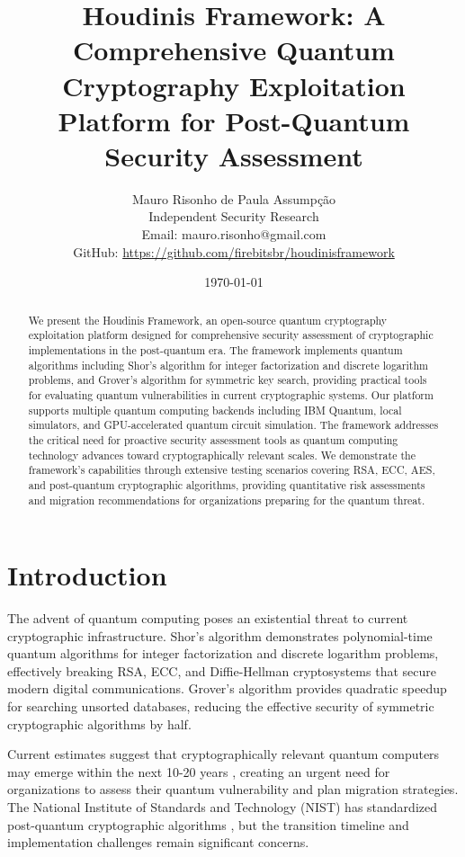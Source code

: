 \documentclass[11pt]{article}
\title{Houdinis Framework: A Comprehensive Quantum Cryptography Exploitation Platform for Post-Quantum Security Assessment}
\author{
Mauro Risonho de Paula Assumpção\\
Independent Security Research\\
Email: mauro.risonho@gmail.com\\
GitHub: \url{https://github.com/firebitsbr/houdinisframework}
}
\date{\today}
\begin{document}
\maketitle

\begin{abstract}
We present the Houdinis Framework, an open-source quantum cryptography exploitation platform designed for comprehensive security assessment of cryptographic implementations in the post-quantum era. The framework implements quantum algorithms including Shor's algorithm for integer factorization and discrete logarithm problems, and Grover's algorithm for symmetric key search, providing practical tools for evaluating quantum vulnerabilities in current cryptographic systems. Our platform supports multiple quantum computing backends including IBM Quantum, local simulators, and GPU-accelerated quantum circuit simulation. The framework addresses the critical need for proactive security assessment tools as quantum computing technology advances toward cryptographically relevant scales. We demonstrate the framework's capabilities through extensive testing scenarios covering RSA, ECC, AES, and post-quantum cryptographic algorithms, providing quantitative risk assessments and migration recommendations for organizations preparing for the quantum threat.
\end{abstract}

\section{Introduction}

The advent of quantum computing poses an existential threat to current cryptographic infrastructure. Shor's algorithm \cite{shor1994algorithms} demonstrates polynomial-time quantum algorithms for integer factorization and discrete logarithm problems, effectively breaking RSA, ECC, and Diffie-Hellman cryptosystems that secure modern digital communications. Grover's algorithm \cite{grover1996fast} provides quadratic speedup for searching unsorted databases, reducing the effective security of symmetric cryptographic algorithms by half.

Current estimates suggest that cryptographically relevant quantum computers may emerge within the next 10-20 years \cite{nist2022quantum}, creating an urgent need for organizations to assess their quantum vulnerability and plan migration strategies. The National Institute of Standards and Technology (NIST) has standardized post-quantum cryptographic algorithms \cite{nist2022pqc}, but the transition timeline and implementation challenges remain significant concerns.
\end{document}
